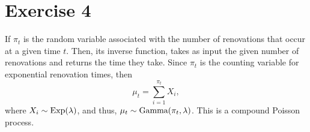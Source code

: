\section{Exercise 4}

If $\pi_t$ is the random variable associated with the number of renovations that occur at a given time $t$. Then, its inverse function, takes as input the given number of renovations and returns the time they take. Since $\pi_t$ is the counting variable for exponential renovation times, then
\[ \mu_t = \sum_{i = 1}^{\pi_t} X_i, \]
where $X_i \sim \hbox{Exp}(\lambda)$, and thus, $\mu_t \sim \hbox{Gamma}(\pi_t, \lambda)$. This is a compound Poisson process. 